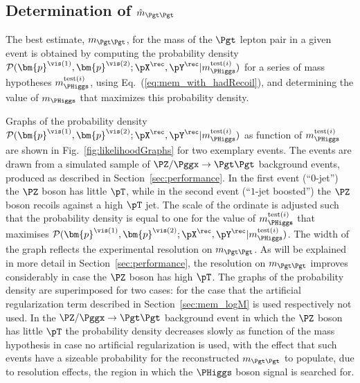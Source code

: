 \subsection{Determination of $\hat{m}_{\Pgt\Pgt}$}
\label{sec:mem_numericalMaximization}

The best estimate, $m_{\Pgt\Pgt}$, for the mass of the $\Pgt$ lepton pair in a given event
is obtained by computing the probability density $\mathcal{P}(\bm{p}^{\vis(1)},\bm{p}^{\vis(2)};\pX^{\rec},\pY^{\rec}|m_{\PHiggs}^{\textrm{test}(i)})$ 
for a series of mass hypotheses $m_{\PHiggs}^{\textrm{test}(i)}$, using Eq.~(\ref{eq:mem_with_hadRecoil}), and determining the value of $m_{\PHiggs}$ that maximizes this probability density.

Graphs of the probability density $\mathcal{P}(\bm{p}^{\vis(1)},\bm{p}^{\vis(2)};\pX^{\rec},\pY^{\rec}|m_{\PHiggs}^{\textrm{test}(i)})$ 
as function of $m_{\PHiggs}^{\textrm{test}(i)}$ are shown in Fig.~\ref{fig:likelihoodGraphs} for two exemplary events.
The events are drawn from a simulated sample of $\PZ/\Pggx \to \Pgt\Pgt$ background events, produced as described in Section~\ref{sec:performance}.
In the first event (``$0$-jet'') the $\PZ$ boson has little $\pT$, while in the second event (``$1$-jet boosted'') the $\PZ$ boson recoils against a high $\pT$ jet.
The scale of the ordinate is adjusted such that the probability density is equal to one
for the value of $m_{\PHiggs}^{\textrm{test}(i)}$ that maximises $\mathcal{P}(\bm{p}^{\vis(1)},\bm{p}^{\vis(2)};\pX^{\rec},\pY^{\rec}|m_{\PHiggs}^{\textrm{test}(i)})$.
The width of the graph reflects the experimental resolution on $m_{\Pgt\Pgt}$.
As will be explained in more detail in Section~\ref{sec:performance}, the resolution on $m_{\Pgt\Pgt}$ improves considerably in case the $\PZ$ boson has high $\pT$.
The graphs of the probability density are superimposed for two cases:
for the case that the artificial regularization term described in Section~\ref{sec:mem_logM} is used respectively not used.
In the $\PZ/\Pggx \to \Pgt\Pgt$ background event in which the $\PZ$ boson has little $\pT$
the probability density decreases slowly as function of the mass hypothesis in case no artificial regularization is used,
with the effect that such events have a sizeable probability for the reconstructed $m_{\Pgt\Pgt}$ to populate, due to resolution effects, 
the region in which the $\PHiggs$ boson signal is searched for.

